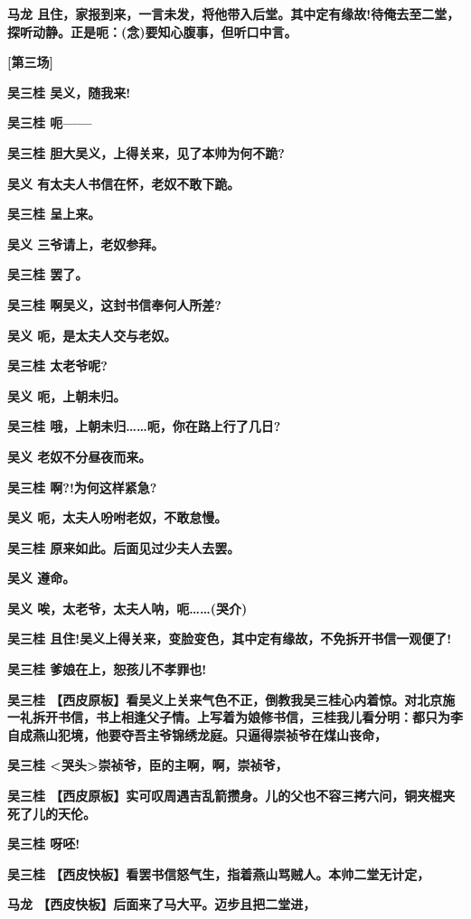 \textbf{马龙
且住，家报到来，一言未发，将他带入后堂。其中定有缘故!待俺去至二堂，探听动静。正是呃：(念)要知心腹事，但听口中言。}

\textbf{{[}第三场{]}}

\textbf{吴三桂 吴义，随我来!}

\textbf{吴三桂 呃------}

\textbf{吴三桂 胆大吴义，上得关来，见了本帅为何不跪?}

\textbf{吴义 有太夫人书信在怀，老奴不敢下跪。}

\textbf{吴三桂 呈上来。}

\textbf{吴义 三爷请上，老奴参拜。}

\textbf{吴三桂 罢了。}

\textbf{吴三桂 啊吴义，这封书信奉何人所差?}

\textbf{吴义 呃，是太夫人交与老奴。}

\textbf{吴三桂 太老爷呢?}

\textbf{吴义 呃，上朝未归。}

\textbf{吴三桂 哦，上朝未归\ldots{}\ldots{}呃，你在路上行了几日?}

\textbf{吴义 老奴不分昼夜而来。}

\textbf{吴三桂 啊?!为何这样紧急?}

\textbf{吴义 呃，太夫人吩咐老奴，不敢怠慢。}

\textbf{吴三桂 原来如此。后面见过少夫人去罢。}

\textbf{吴义 遵命。}

\textbf{吴义 唉，太老爷，太夫人呐，呃\ldots{}\ldots{}(哭介)}

\textbf{吴三桂
且住!吴义上得关来，变脸变色，其中定有缘故，不免拆开书信一观便了!}

\textbf{吴三桂 爹娘在上，恕孩儿不孝罪也!}

\textbf{吴三桂
【西皮原板】看吴义上关来气色不正，倒教我吴三桂心内着惊。对北京施一礼拆开书信，书上相逢父子情。上写着为娘修书信，三桂我儿看分明：都只为李自成燕山犯境，他要夺吾主爷锦绣龙庭。只逼得崇祯爷在煤山丧命，}

\textbf{吴三桂
\textless{}哭头\textgreater{}崇祯爷，臣的主啊，啊，崇祯爷，}

\textbf{吴三桂
【西皮原板】实可叹周遇吉乱箭攒身。儿的父也不容三拷六问，铜夹棍夹死了儿的天伦。}

\textbf{吴三桂 呀呸!}

\textbf{吴三桂
【西皮快板】看罢书信怒气生，指着燕山骂贼人。本帅二堂无计定，}

\textbf{马龙 【西皮快板】后面来了马大平。迈步且把二堂进，}


